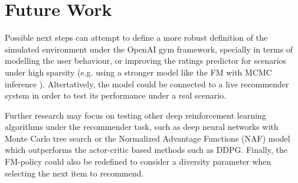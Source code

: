 \section{Future Work}

Possible next steps can attempt to define a more robust definition of the simulated environment under the OpenAI gym framework, specially in terms of modelling the user behaviour, or improving the ratings predictor for scenarios under high sparsity (e.g. using a stronger model like the FM with MCMC inference \cite{rendle2012factorization}). Altertatively, the model could be connected to a live recommender system in order to test its performance under a real scenario.

Further research may focus on testing other deep reinforcement learning algorithms under the recommender task, such as deep neural networks with Monte Carlo tree search \cite{silver2016mastering} or the Normalized Advantage Functions (NAF) model \cite{gu2016continuous} which outperforms the actor-critic based methods such as DDPG. Finally, the FM-policy could also be redefined to consider a diversity parameter when selecting the next item to recommend.